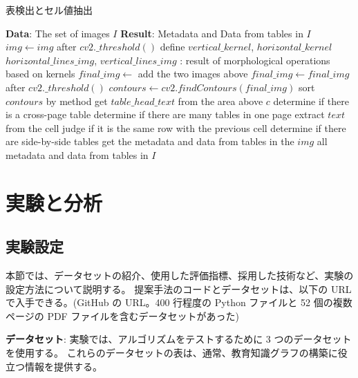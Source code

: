 \documentclass[uplatex, twocolumn,10pt]{jsarticle}
\begin{document}
\begin{algorithm}
    \caption{表検出とセル値抽出}
    \begin{algorithmic}
    \STATE \textbf{Data}: The set of images $I$
    \STATE \textbf{Result}: Metadata and Data from tables in $I$
        \STATE $img \leftarrow img$ after $cv2.\_threshold()$
        \STATE define $vertical\_kernel$, $horizontal\_kernel$
        \STATE $horizontal\_lines\_img$, $vertical\_lines\_img$ : result of
        \STATE \quad morphological operations based on kernels
        \STATE $final\_img \leftarrow$ add the two images above
        \STATE $final\_img \leftarrow final\_img$ after $cv2.\_threshold()$
        \STATE $contours \leftarrow cv2.findContours(final\_img)$
        \STATE sort $contours$ by method
                \STATE get $table\_head\_text$ from the area above $c$
                \STATE determine if there is a cross-page table
                \STATE determine if there are many tables in one page
                \STATE extract $text$ from the cell
                \STATE judge if it is the same row with the previous cell
                \STATE determine if there are side-by-side tables
            \ENDIF
            \STATE get the metadata and data from tables in the $img$
        \ENDFOR
        \STATE all metadata and data from tables in $I$
    \ENDFOR
    \end{algorithmic}
\end{algorithm}


\section{実験と分析}

\subsection{実験設定}
本節では、データセットの紹介、使用した評価指標、採用した技術など、実験の設定方法について説明する。
提案手法のコードとデータセットは、以下の URL で入手できる。(GitHub の URL。400 行程度の Python ファイルと 52 個の複数ページの PDF ファイルを含むデータセットがあった)

\textbf{データセット}:
実験では、アルゴリズムをテストするために 3 つのデータセットを使用する。
これらのデータセットの表は、通常、教育知識グラフの構築に役立つ情報を提供する。
\end{document}
